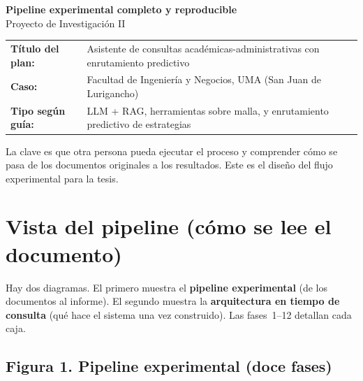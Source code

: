 \documentclass[11pt,a4paper]{article}
\begin{document}
\begin{center}
{\LARGE\bfseries Pipeline experimental completo y reproducible}\\[0.25em]
{\large Proyecto de Investigación II}\\[0.45em]
\begin{tabular}{@{}p{}p{}@{}}
\bfseries Título del plan: &
Asistente de consultas académicas-administrativas con enrutamiento predictivo \\[0.15em]
\bfseries Caso: &
Facultad de Ingeniería y Negocios, UMA (San Juan de Lurigancho) \\[0.15em]
\bfseries Tipo según guía: &
LLM + RAG, herramientas sobre malla, y enrutamiento predictivo de estrategias \\
\end{tabular}
\end{center}

\vspace{0.3em}
\noindent
La clave es que otra persona pueda ejecutar el proceso y comprender cómo se pasa de los documentos originales a los resultados. Este es el diseño del flujo experimental para la tesis.

\section{Vista del pipeline (cómo se lee el documento)}

Hay dos diagramas. El primero muestra el \textbf{pipeline experimental} (de los documentos al informe). El segundo muestra la \textbf{arquitectura en tiempo de consulta} (qué hace el sistema una vez construido). Las fases~1--12 detallan cada caja.

\subsection*{Figura 1. Pipeline experimental (doce fases)}
\end{document}
